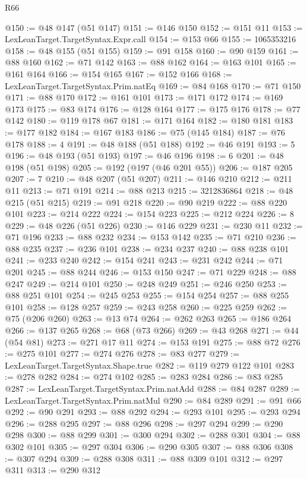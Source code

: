\begin{lexlean}{R66}
\begin{coremodule}
@150 := @48 @147 (@51 @147)
@151 := @146 @150
@152 := @151 @11
@153 := LexLeanTarget.TargetSyntax.Expr.call
@154 := @153 @66
@155 := 1065353216
@158 := @48 @155 (@51 @155)
@159 := @91 @158
@160 := @90 @159
@161 := @88 @160
@162 := @71 @142
@163 := @88 @162
@164 := @163 @101
@165 := @161 @164
@166 := @154 @165
@167 := @152 @166
@168 := LexLeanTarget.TargetSyntax.Prim.natEq
@169 := @84 @168
@170 := @71 @150
@171 := @88 @170
@172 := @161 @101
@173 := @171 @172
@174 := @169 @173
@175 := @83 @174
@176 := @128 @164
@177 := @175 @176
@178 := @77 @142
@180 := @119 @178 @67
@181 := @171 @164
@182 := @180 @181
@183 := @177 @182
@184 := @167 @183
@186 := @75 (@145 @184)
@187 := @76 @178
@188 := 4
@191 := @48 @188 (@51 @188)
@192 := @46 @191
@193 := 5
@196 := @48 @193 (@51 @193)
@197 := @46 @196
@198 := 6
@201 := @48 @198 (@51 @198)
@205 := @192 (@197 (@46 @201 @55))
@206 := @187 @205
@207 := 7
@210 := @48 @207 (@51 @207)
@211 := @146 @210
@212 := @211 @11
@213 := @71 @191
@214 := @88 @213
@215 := 3212836864
@218 := @48 @215 (@51 @215)
@219 := @91 @218
@220 := @90 @219
@222 := @88 @220 @101
@223 := @214 @222
@224 := @154 @223
@225 := @212 @224
@226 := 8
@229 := @48 @226 (@51 @226)
@230 := @146 @229
@231 := @230 @11
@232 := @71 @196
@233 := @88 @232
@234 := @153 @142
@235 := @71 @210
@236 := @88 @235
@237 := @236 @101
@238 := @234 @237
@240 := @88 @238 @101
@241 := @233 @240
@242 := @154 @241
@243 := @231 @242
@244 := @71 @201
@245 := @88 @244
@246 := @153 @150
@247 := @71 @229
@248 := @88 @247
@249 := @214 @101
@250 := @248 @249
@251 := @246 @250
@253 := @88 @251 @101
@254 := @245 @253
@255 := @154 @254
@257 := @88 @255 @101
@258 := @128 @257
@259 := @243 @258
@260 := @225 @259
@262 := @75 (@206 @260)
@263 := @13 @74
@264 := @262 @263
@265 := @186 @264
@266 := @137 @265
@268 := @68 (@73 @266)
@269 := @43 @268
@271 := @44 (@54 @81)
@273 := @271 @17 @11
@274 := @153 @191
@275 := @88 @72
@276 := @275 @101
@277 := @274 @276
@278 := @83 @277
@279 := LexLeanTarget.TargetSyntax.Shape.true
@282 := @119 @279 @122 @101
@283 := @278 @282
@284 := @274 @102
@285 := @283 @284
@286 := @83 @285
@287 := LexLeanTarget.TargetSyntax.Prim.natAdd
@288 := @84 @287
@289 := LexLeanTarget.TargetSyntax.Prim.natMul
@290 := @84 @289
@291 := @91 @66
@292 := @90 @291
@293 := @88 @292
@294 := @293 @101
@295 := @293 @294
@296 := @288 @295
@297 := @88 @296
@298 := @297 @294
@299 := @290 @298
@300 := @88 @299
@301 := @300 @294
@302 := @288 @301
@304 := @88 @302 @101
@305 := @297 @304
@306 := @290 @305
@307 := @88 @306
@308 := @307 @294
@309 := @288 @308
@311 := @88 @309 @101
@312 := @297 @311
@313 := @290 @312

\end{coremodule}
\end{lexlean}
